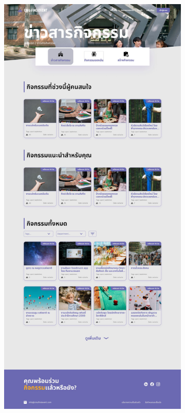 \begin{figure}[h]
  \centering
  \begin{subfigure}[b]{0.3\linewidth}
    \includegraphics[width=\linewidth]{image/Figma-design/New-Event-info.jpg}

\end{subfigure}
\end{figure}
